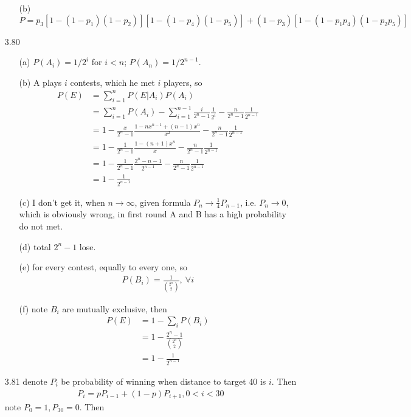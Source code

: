 \documentclass[paper=a4, fontsize=11pt]{scrartcl} %
\numberwithin{equation}{section} %
\numberwithin{figure}{section} %
\numberwithin{table}{section} %
\begin{document}
\begin{itemize}
\begin{itemize}
		\item[(b)] $P = p_3[1-(1-p_1)(1-p_2)][1-(1-p_4)(1-p_5)] + (1-p_3)[1-(1-p_1p_4)(1-p_2p_5)]$
	\end{itemize}
	\item[3.80]
	\begin{itemize}
		\item[(a)] $P(A_i)=1/2^i$ for $i<n$; $P(A_n)=1/2^{n-1}$.
		\item[(b)] A plays $i$ contests, which he met $i$ players, so
		\begin{align}
			P(E) &= \sum_{i=1}^n P(E|A_i)P(A_i) \\
				&= \sum_{i=1}^nP(A_i) - \sum_{i=1}^{n-1} \frac{i}{2^n-1} \frac{1}{2^i}-\frac{n}{2^n-1}\frac{1}{2^{n-1}} \\
				&= 1-\frac{x}{2^n-1} \frac{1-nx^{n-1}+(n-1)x^n}{x^2} -\frac{n}{2^n-1}\frac{1}{2^{n-1}} \\
				&= 1-\frac{1}{2^n-1} \frac{1-(n+1)x^n}{x} -\frac{n}{2^n-1}\frac{1}{2^{n-1}}\\
				&= 1-\frac{1}{2^n-1} \frac{2^n-n-1}{2^{n-1}} -\frac{n}{2^n-1}\frac{1}{2^{n-1}} \\
				&= 1- \frac{1}{2^{n-1}}
		\end{align}
		\item[(c)] I don't get it, when $n\rightarrow\infty$, given formula $P_n\rightarrow \frac{1}{4} P_{n-1}$, i.e. $P_n\rightarrow 0$, which is obviously wrong, in first round A and B has a high probability do not met.
		\item[(d)] total $2^n-1$ lose.
		\item[(e)] for every contest, equally to every one, so
		\begin{align}
			P(B_i) = \frac{1}{ {2^n\choose 2} },\ \forall i
		\end{align}
		\item[(f)] note $B_i$ are mutually exclusive, then
		\begin{align}
			P(E) &= 1 - \sum_i P(B_i) \\
				&= 1 - \frac{2^n -1 }{ {2^n\choose 2} }\\
				&= 1 - \frac{1}{2^{n-1}}
		\end{align}
	\end{itemize}
	\item[3.81] denote $P_i$ be probability of winning when distance to target 40 is $i$. Then
	\begin{align}
		P_i = p P_{i-1} + (1-p) P_{i+1}, 0<i<30
	\end{align}
	note $P_0=1, P_{30}=0$. Then
	\begin{align}

\end{align}
\end{itemize}
\end{document}
